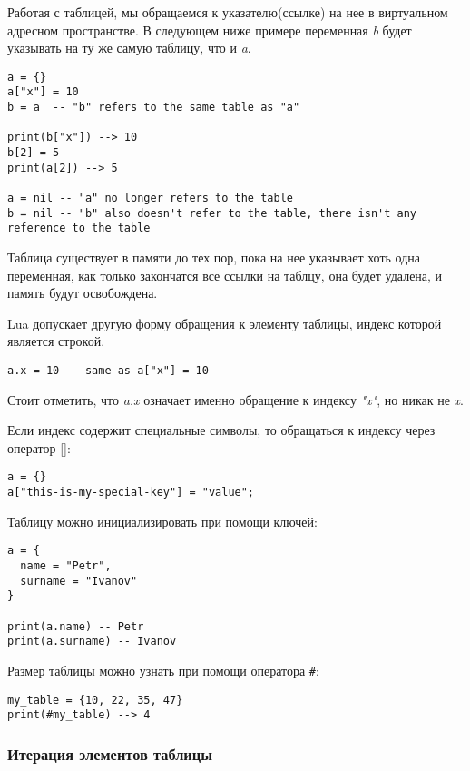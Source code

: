 Работая с таблицей, мы обращаемся к указателю(ссылке) на нее в виртуальном адресном пространстве.
В следующем ниже примере переменная \emph{b} будет указывать на ту же самую таблицу, что и \emph{a}.
\begin{lstlisting}
a = {}
a["x"] = 10
b = a  -- "b" refers to the same table as "a"  

print(b["x"]) --> 10
b[2] = 5
print(a[2]) --> 5
   
a = nil -- "a" no longer refers to the table
b = nil -- "b" also doesn't refer to the table, there isn't any reference to the table 
\end{lstlisting} 

Таблица существует в памяти до тех пор, пока на нее указывает хоть одна переменная, как только закончатся все ссылки на таблцу, она будет удалена, и память будут освобождена.

Lua допускает другую форму обращения к элементу таблицы, индекс которой является строкой. 

\begin{lstlisting}
a.x = 10 -- same as a["x"] = 10
\end{lstlisting}

Стоит отметить, что \emph{a.x} означает именно обращение к индексу \emph{"x"}, но никак не \emph{x}. 

Если индекс содержит специальные символы, то обращаться к индексу через оператор []:

\begin{lstlisting}
a = {}
a["this-is-my-special-key"] = "value";
\end{lstlisting}

Таблицу можно инициализировать при помощи ключей:

\begin{lstlisting}
a = {
  name = "Petr",
  surname = "Ivanov"
}

print(a.name) -- Petr
print(a.surname) -- Ivanov
\end{lstlisting}

Размер таблицы можно узнать при помощи оператора \lstinline{#}:

\begin{lstlisting}
my_table = {10, 22, 35, 47}
print(#my_table) --> 4
\end{lstlisting}

\subsubsection{Итерация элементов таблицы}

